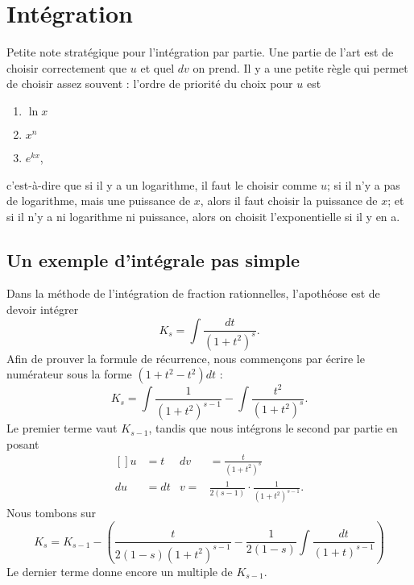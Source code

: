 \section{Intégration}

Petite note stratégique pour l'intégration par partie. Une partie de l'art est de choisir correctement que $u$ et quel $dv$ on prend. Il y a une petite règle qui permet de choisir assez souvent : l'ordre de priorité du choix pour $u$ est
\let\OldTheEnumi\theenumi
\renewcommand{\theenumi}{\arabic{enumi}}
\begin{enumerate}
\item $\ln x$
\item $x^n$
\item $ e^{kx}$,
\end{enumerate}
\let\theenumi\OldTheEnumi
c'est-à-dire que si il y a un logarithme, il faut le choisir comme $u$; si il n'y a pas de logarithme, mais une puissance de $x$, alors il faut choisir la puissance de $x$; et si il n'y a ni logarithme ni puissance, alors on choisit l'exponentielle si il y en a.

\subsection{Un exemple d'intégrale pas simple}



Dans la méthode de l'intégration de fraction rationnelles, l'apothéose est de devoir intégrer 
\begin{equation}
	K_s=\int \frac{ dt }{ (1+t^2)^s }.
\end{equation}
Afin de prouver la formule de récurrence, nous commençons par écrire le numérateur sous la forme $(1+t^2-t^2)dt$ :
\begin{equation}
	K_s=\int \frac{ 1 }{ (1+t^2)^{s-1} }-\int \frac{ t^2 }{ (1+t^2)^s }.
\end{equation}
Le premier terme vaut $K_{s-1}$, tandis que nous intégrons le second par partie en posant
\begin{equation}
	\begin{aligned}[]
		u&=t		&	dv&=\frac{ t }{ (1+t^2)^s }\\
		du&=dt		&	v=&\frac{1}{ 2(s-1) }\cdot \frac{1}{ (1+t^2)^{s-1} }.
	\end{aligned}
\end{equation}
Nous tombons sur
\begin{equation}
	K_{s}=K_{s-1}-\left( \frac{ t }{ 2(1-s)(1+t^2)^{s-1} } - \frac{1}{ 2(1-s) }\int \frac{ dt }{ (1+t)^{s-1} } \right)
\end{equation}
Le dernier terme donne encore un multiple de $K_{s-1}$.

